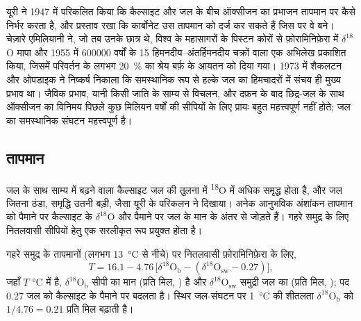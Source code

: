 \begin{history}[एक अभिलेख के दो पाठ]
यूरी ने 1947 में परिकलित किया कि कैल्साइट और जल के बीच ऑक्सीजन का प्रभाजन तापमान पर कैसे
निर्भर करता है, और प्रस्ताव रखा कि कार्बोनेट उस तापमान को दर्ज कर सकते हैं जिस पर वे बने। चेज़ारे
एमिलियानी ने, जो तब उनके छात्र थे, विश्व के महासागरों के पिस्टन कोरों से फ़ोरामिनिफ़ेरा में $\delta^{18}$O
मापा और 1955 में \num{600000} वर्षों के 15 हिमनदीय--अंतर्हिमनदीय चक्रों वाला
एक अभिलेख प्रकाशित किया, जिसमें परिवर्तन के लगभग \qty{20}{\percent} का श्रेय बर्फ़ के आयतन को दिया गया।
1973 में शैकलटन और ओपडाइक ने निष्कर्ष निकाला कि समस्थानिक रूप से हल्के जल का
हिमचादरों में संचय ही मुख्य प्रभाव था। जैविक प्रभाव, यानी किसी जाति के साम्य से विचलन,
और दफ़न के बाद छिद्र-जल के साथ ऑक्सीजन का विनिमय पिछले कुछ मिलियन वर्षों की सीपियों के लिए
प्रायः बहुत महत्त्वपूर्ण नहीं होते; जल का समस्थानिक संघटन महत्त्वपूर्ण है।
\end{history}

\subsection*{तापमान}

जल के साथ साम्य में बढ़ने वाला कैल्साइट जल की तुलना में \textsuperscript{18}O में अधिक समृद्ध होता है,
और जल जितना ठंडा, समृद्धि उतनी बड़ी, जैसा यूरी के परिकलन ने दिखाया। अनेक
आनुभविक अंशांकन
तापमान को  पैमाने पर कैल्साइट के $\delta^{18}$O और  पैमाने पर जल के मान के
अंतर से जोड़ते हैं। गहरे समुद्र के लिए नितलवासी
सीपियों हेतु एक सरलीकृत रूप प्रयुक्त होता है।

\begin{proposition}[एक नितलवासी अंशांकन]\label{prop:b2:climate-proxies:benthic}
गहरे समुद्र के तापमानों (लगभग \qty{13}{\celsius} से नीचे) पर नितलवासी फ़ोरामिनिफ़ेरा के लिए,
\[
  T = 16.1 - 4.76\,\bigl[\delta^{18}\mathrm{O}_{\mathrm{b}} - (\delta^{18}\mathrm{O}_{\mathrm{sw}} -
  0.27)\bigr],
\]
जहाँ $T$ \unit{\celsius} में है, $\delta^{18}\mathrm{O}_{\mathrm{b}}$ सीपी का मान (प्रति मिल,
) है और $\delta^{18}\mathrm{O}_{\mathrm{sw}}$ समुद्री जल का (प्रति मिल, ); पद
0.27 जल को कैल्साइट के पैमाने पर बदलता है। स्थिर जल-संघटन पर \qty{1}{\celsius} की शीतलता
$\delta^{18}\mathrm{O}_{\mathrm{b}}$ को $1/4.76 = 0.21$ प्रति मिल बढ़ाती है।
\end{proposition}
\admitted

